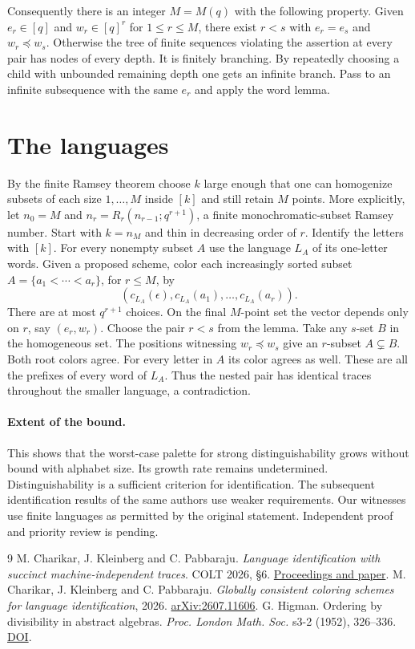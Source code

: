 \documentclass[11pt]{article}
\begin{document}
Consequently there is an integer $M=M(q)$ with the following property. Given $e_r\in[q]$ and $w_r\in[q]^r$ for $1\le r\le M$, there exist $r<s$ with $e_r=e_s$ and $w_r\preceq w_s$. Otherwise the tree of finite sequences violating the assertion at every pair has nodes of every depth. It is finitely branching. By repeatedly choosing a child with unbounded remaining depth one gets an infinite branch. Pass to an infinite subsequence with the same $e_r$ and apply the word lemma.

\section{The languages}
By the finite Ramsey theorem choose $k$ large enough that one can homogenize subsets of each size $1,\ldots,M$ inside $[k]$ and still retain $M$ points. More explicitly, let $n_0=M$ and $n_r=R_r(n_{r-1};q^{r+1})$, a finite monochromatic-subset Ramsey number. Start with $k=n_M$ and thin in decreasing order of $r$. Identify the letters with $[k]$. For every nonempty subset $A$ use the language $L_A$ of its one-letter words. Given a proposed scheme, color each increasingly sorted subset $A=\{a_1<\cdots<a_r\}$, for $r\le M$, by
\[
       (c_{L_A}(\epsilon),c_{L_A}(a_1),\dots,c_{L_A}(a_r)).
\]
There are at most $q^{r+1}$ choices. On the final $M$-point set the vector depends only on $r$, say $(e_r,w_r)$. Choose the pair $r<s$ from the lemma. Take any $s$-set $B$ in the homogeneous set. The positions witnessing $w_r\preceq w_s$ give an $r$-subset $A\subsetneq B$. Both root colors agree. For every letter in $A$ its color agrees as well. These are all the prefixes of every word of $L_A$. Thus the nested pair has identical traces throughout the smaller language, a contradiction.

\paragraph{Extent of the bound.} This shows that the worst-case palette for strong distinguishability grows without bound with alphabet size. Its growth rate remains undetermined. Distinguishability is a sufficient criterion for identification. The subsequent identification results of the same authors \cite{global} use weaker requirements. Our witnesses use finite languages as permitted by the original statement. Independent proof and priority review is pending.
\begin{thebibliography}{9}
 M. Charikar, J. Kleinberg and C. Pabbaraju. \emph{Language identification with succinct machine-independent traces}. COLT 2026, \S6. \href{https://proceedings.mlr.press/v336/charikar26b.html}{Proceedings and paper}.
 M. Charikar, J. Kleinberg and C. Pabbaraju. \emph{Globally consistent coloring schemes for language identification}, 2026. \href{https://arxiv.org/abs/2607.11606}{arXiv:2607.11606}.
 G. Higman. Ordering by divisibility in abstract algebras. \emph{Proc. London Math. Soc.} s3-2 (1952), 326--336. \href{https://doi.org/10.1112/plms/s3-2.1.326}{DOI}.
\end{thebibliography}
\end{document}
